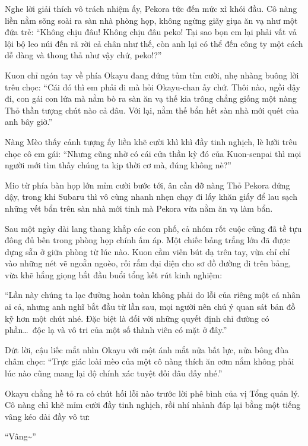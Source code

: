 \documentclass[../main.tex]{subfiles}
\begin{document}
Nghe lời giải thích vô trách nhiệm ấy, Pekora tức đến mức xì khói đầu. Cô nàng liền nằm sõng soài ra sàn nhà phòng họp, không ngừng giãy giụa ăn vạ như một đứa trẻ: ``Không chịu đâu! Không chịu đâu peko! Tại sao bọn em lại phải vất vả lội bộ leo núi đến rã rời cả chân như thế, còn anh lại có thể đến công ty một cách dễ dàng và thong thả như vậy chứ, peko!?''

Kuon chỉ ngón tay về phía Okayu đang đứng tủm tỉm cười, nhẹ nhàng buông lời trêu chọc: ``Cái đó thì em phải đi mà hỏi Okayu-chan ấy chứ. Thôi nào, ngồi dậy đi, con gái con lứa mà nằm bò ra sàn ăn vạ thế kia trông chẳng giống một nàng Thỏ thần tượng chút nào cả đâu. Với lại, nằm thế bẩn hết sàn nhà mới quét của anh bây giờ.''

Nàng Mèo thấy cảnh tượng ấy liền khẽ cười khì khì đầy tinh nghịch, lè lưỡi trêu chọc cô em gái: ``Nhưng cũng nhờ có cái cửa thần kỳ đó của Kuon-senpai thì mọi người mới tìm thấy chúng ta kịp thời cơ mà, đúng không nè?''

Mio từ phía bàn họp lớn mỉm cười bước tới, ân cần đỡ nàng Thỏ Pekora đứng dậy, trong khi Subaru thì vô cùng nhanh nhẹn chạy đi lấy khăn giấy để lau sạch những vết bẩn trên sàn nhà mới tinh mà Pekora vừa nằm ăn vạ làm bẩn.

\ct

Sau một ngày dài lang thang khắp các con phố, cả nhóm rốt cuộc cũng đã tề tựu đông đủ bên trong phòng họp chính ấm áp. Một chiếc bảng trắng lớn đã được dựng sẵn ở giữa phòng từ lúc nào. Kuon cầm viên bút dạ trên tay, vừa chỉ chỉ vào những nét vẽ ngoằn ngoèo, rối rắm đại diện cho sơ đồ đường đi trên bảng, vừa khẽ hắng giọng bắt đầu buổi tổng kết rút kinh nghiệm:

``Lần này chúng ta lạc đường hoàn toàn không phải do lỗi của riêng một cá nhân ai cả, nhưng anh nghĩ bắt đầu từ lần sau, mọi người nên chú ý quan sát bản đồ kỹ hơn một chút nhé. Đặc biệt là đối với những quyết định chỉ đường có phần\dots\ độc lạ và vô tri của một số thành viên có mặt ở đây.''

Dứt lời, cậu liếc mắt nhìn Okayu với một ánh mắt nửa bất lực, nửa bông đùa châm chọc:  ``Trực giác loài mèo của một cô nàng thích ăn cơm nắm không phải lúc nào cũng mang lại độ chính xác tuyệt đối đâu đấy nhé.''

Okayu chẳng hề tỏ ra có chút hối lỗi nào trước lời phê bình của vị Tổng quản lý. Cô nàng chỉ khẽ mỉm cười đầy tinh nghịch, rồi nhí nhảnh đáp lại bằng một tiếng vâng kéo dài đầy vô tư:

``Vâng\~{}''
\end{document}
